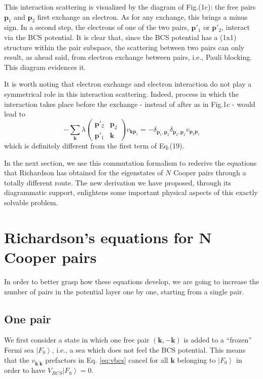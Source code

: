 \documentclass[epj]{svjour}
\newcommand{\vk}{\ensuremath{\mathbf{k}}}
\newcommand{\vp}{\ensuremath{\mathbf{p}}}
\begin{document}
This interaction scattering is visualized by the diagram of Fig.(1c): the free pairs $\mathbf{p}_1$ and $\mathbf{p}_2$ first
exchange an electron. As for any exchange, this brings a minus sign. In a
second step, the electrons of one of the two pairs, $\mathbf{p}' _1$ or ${\mathbf{p}}' _2$,  interact via the BCS
potential. It is clear that, since the BCS potential has a (1x1)
structure within the pair subspace, the scattering between two pairs can only result, as ahead said, from
electron exchange between pairs, i.e., Pauli blocking. This diagram evidences it.

It is worth noting that electron exchange and electron interaction do not play a symmetrical role in this interaction scattering. Indeed, process in which the interaction takes place before the exchange - instead of after as in Fig.1c - would lead to
\begin{equation}
-\sum_\vk \lambda\left(%
\begin{smallmatrix}\vp'_2&\vp_2\\\vp'_1&\mathbf{k}\end{smallmatrix}\right)v_{\mathbf{k}\mathbf{p} _1 } =-\delta_{\mathbf{p}
^{\prime}_1,\mathbf{p}^{\prime} _2}\delta_{\mathbf{p}
^{\prime}_2,\mathbf{p} _2}v_{\mathbf{p} _2\mathbf{p} _1}
\end{equation}
which is definitely different from the first term of Eq.(19).

In the next section, we use this commutation formalism to rederive the equations that Richardson has obtained for the eigenstates of $N$ Cooper pairs through a totally different route. The new derivation we have proposed, through its diagrammatic support, enlightens some important physical aspects of this exactly solvable problem.

\section{Richardson's equations for N Cooper pairs\label{sec:rich}}

In order to better grasp how these equations develop, we are going to increase the number of pairs in the potential layer one by one, starting from a single pair.

\subsection{One pair}

We first consider a state in which one free pair $(\mathbf{k} ,-\mathbf{k} )$ is added to a
``frozen'' Fermi sea $\left|F_0\right> $, i.e., a sea which does not feel the BCS potential.
This means that the $v_{\mathbf{k} ^{\prime}\mathbf{k} }$ prefactors in Eq.%
\eqref{eq:vbcs} cancel for all $\mathbf{k} $ belonging to $\left|F_0\right> $ in order to have $V_{BCS} \left|F_0\right>=0$.
\end{document}
